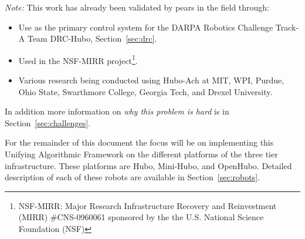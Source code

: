\noindent \textit{Note:} This work has already been validated by pears in the field through:
\begin{itemize}
\item Use as the primary control system for the DARPA Robotics Challenge Track-A Team DRC-Hubo, Section~\ref{sec:drc}.
\item Used in the NSF-MIRR project\footnote{NSF-MIRR: Major Research Infrastructure Recovery and Reinvestment (MIRR) \#CNS-0960061 sponsored by the the U.S. National Science Foundation (NSF)}.
\item Various research being conducted using Hubo-Ach at MIT, WPI, Purdue, Ohio State, Swarthmore College, Georgia Tech, and Drexel University.
\end{itemize}
\noindent In addition more information on \textit{why this problem is hard} is in Section~\ref{sec:challenges}.

For the remainder of this document the focus will be on implementing this Unifying Algorithmic Framework on the different platforms of the three tier infrastructure.
These platforms are Hubo, Mini-Hubo, and OpenHubo.  
Detailed description of each of these robots are available in Section~\ref{sec:robots}.








































